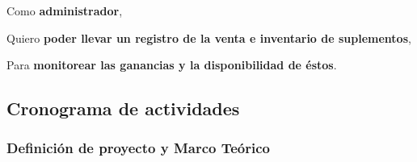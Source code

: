\documentclass[spanish, 12pt]{article}
\begin{document}
	\noindent
	\begin{minipage}{0.498\linewidth}
		\noindent
		\begin{PostItNote}
			[Width=0.9\linewidth,Corner=true,Pin=None,Color=html5,Rotate=-0.3 ,Title={ Control de Acceso y Permisos},FontTitle={\bfseries\itshape}
			] Como \textbf{administrador},

			Quiero \textbf{poder llevar un registro de la venta e inventario de
			suplementos},

			Para \textbf{monitorear las ganancias y la disponibilidad de éstos}.
		\end{PostItNote}
		\vspace{0.5cm}
	\end{minipage}
	\subsection{Cronograma de actividades}
	\label{cronograma}
	\subsubsection{Definición de proyecto y Marco Teórico}
\end{document}
